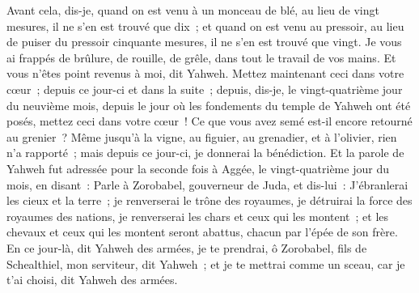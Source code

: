 \begin{multicols}{2}
Avant cela, dis-je, quand on est venu à un monceau de blé, au lieu de vingt mesures, il ne s'en est trouvé que dix~; et quand on est venu au pressoir, au lieu de puiser du pressoir cinquante mesures, il ne s'en est trouvé que vingt.
Je vous ai frappés de brûlure, de rouille, de grêle, dans tout le travail de vos mains. Et vous n'êtes point revenus à moi, dit Yahweh.
Mettez maintenant ceci dans votre cœur~; depuis ce jour-ci et dans la suite~; depuis, dis-je, le vingt-quatrième jour du neuvième mois, depuis le jour où les fondements du temple de Yahweh ont été posés, mettez ceci dans votre cœur~!
Ce que vous avez semé est-il encore retourné au grenier~? Même jusqu'à la vigne, au figuier, au grenadier, et à l'olivier, rien n'a rapporté~; mais depuis ce jour-ci, je donnerai la bénédiction.
Et la parole de Yahweh fut adressée pour la seconde fois à Aggée, le vingt-quatrième jour du mois, en disant~:
Parle à Zorobabel, gouverneur de Juda, et dis-lui~: J'ébranlerai les cieux et la terre~;
je renverserai le trône des royaumes, je détruirai la force des royaumes des nations, je renverserai les chars et ceux qui les montent~; et les chevaux et ceux qui les montent seront abattus, chacun par l'épée de son frère.
En ce jour-là, dit Yahweh des armées, je te prendrai, ô Zorobabel, fils de Schealthiel, mon serviteur, dit Yahweh~; et je te mettrai comme un sceau, car je t'ai choisi, dit Yahweh des armées.
\PPE{}
\end{multicols}
